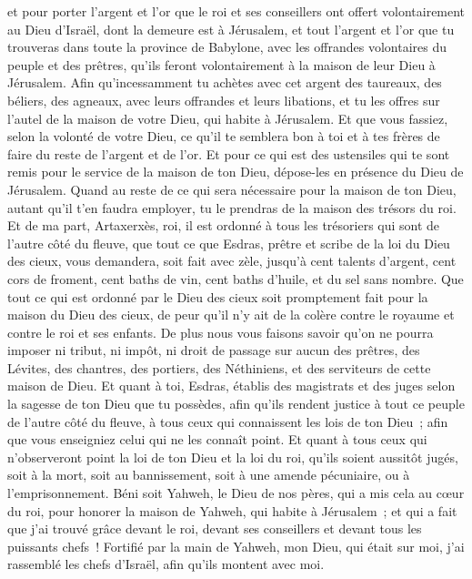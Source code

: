 \begin{multicols}{2}
et pour porter l'argent et l'or que le roi et ses conseillers ont offert volontairement au Dieu d'Israël, dont la demeure est à Jérusalem,
et tout l'argent et l'or que tu trouveras dans toute la province de Babylone, avec les offrandes volontaires du peuple et des prêtres, qu'ils feront volontairement à la maison de leur Dieu à Jérusalem.
Afin qu'incessamment tu achètes avec cet argent des taureaux, des béliers, des agneaux, avec leurs offrandes et leurs libations, et tu les offres sur l'autel de la maison de votre Dieu, qui habite à Jérusalem.
Et que vous fassiez, selon la volonté de votre Dieu, ce qu'il te semblera bon à toi et à tes frères de faire du reste de l'argent et de l'or.
Et pour ce qui est des ustensiles qui te sont remis pour le service de la maison de ton Dieu, dépose-les en présence du Dieu de Jérusalem.
Quand au reste de ce qui sera nécessaire pour la maison de ton Dieu, autant qu'il t'en faudra employer, tu le prendras de la maison des trésors du roi.
Et de ma part, Artaxerxès, roi, il est ordonné à tous les trésoriers qui sont de l'autre côté du fleuve, que tout ce que Esdras, prêtre et scribe de la loi du Dieu des cieux, vous demandera, soit fait avec zèle,
jusqu'à cent talents d'argent, cent cors de froment, cent baths de vin, cent baths d'huile, et du sel sans nombre.
Que tout ce qui est ordonné par le Dieu des cieux soit promptement fait pour la maison du Dieu des cieux, de peur qu'il n'y ait de la colère contre le royaume et contre le roi et ses enfants.
De plus nous vous faisons savoir qu'on ne pourra imposer ni tribut, ni impôt, ni droit de passage sur aucun des prêtres, des Lévites, des chantres, des portiers, des Néthiniens, et des serviteurs de cette maison de Dieu.
Et quant à toi, Esdras, établis des magistrats et des juges selon la sagesse de ton Dieu que tu possèdes, afin qu'ils rendent justice à tout ce peuple de l'autre côté du fleuve, à tous ceux qui connaissent les lois de ton Dieu~; afin que vous enseigniez celui qui ne les connaît point.
Et quant à tous ceux qui n'observeront point la loi de ton Dieu et la loi du roi, qu'ils soient aussitôt jugés, soit à la mort, soit au bannissement, soit à une amende pécuniaire, ou à l'emprisonnement.
Béni soit Yahweh, le Dieu de nos pères, qui a mis cela au cœur du roi, pour honorer la maison de Yahweh, qui habite à Jérusalem~;
et qui a fait que j'ai trouvé grâce devant le roi, devant ses conseillers et devant tous les puissants chefs~! Fortifié par la main de Yahweh, mon Dieu, qui était sur moi, j'ai rassemblé les chefs d'Israël, afin qu'ils montent avec moi.

\end{multicols}
